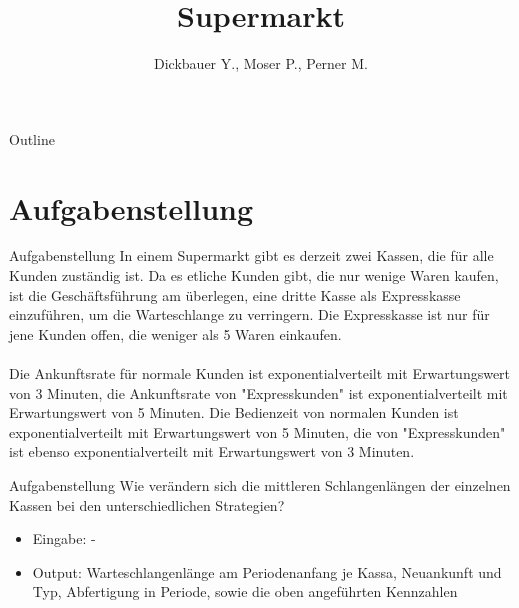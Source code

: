 

\title[BSP30 - Supermarkt]{Supermarkt}
\author{Dickbauer Y., Moser P., Perner M.}



\begin{frame}
  \titlepage
\end{frame}

\begin{frame}{Outline}
  \tableofcontents
\end{frame}

\section{Aufgabenstellung}
\begin{frame}{Aufgabenstellung}
In einem Supermarkt gibt es derzeit zwei Kassen, die für alle Kunden zuständig ist. Da es etliche Kunden gibt, die nur wenige Waren kaufen, ist die Geschäftsführung am überlegen, eine dritte Kasse als Expresskasse einzuführen, um die Warteschlange zu verringern. Die Expresskasse ist nur für jene Kunden offen, die weniger als 5 Waren einkaufen.
\\~\\
Die Ankunftsrate für normale Kunden ist exponentialverteilt mit Erwartungswert von 3 Minuten, die Ankunftsrate von "Expresskunden" ist exponentialverteilt mit Erwartungswert von 5 Minuten. Die Bedienzeit von normalen Kunden ist exponentialverteilt mit Erwartungswert von 5 Minuten, die von "Expresskunden" ist ebenso exponentialverteilt mit Erwartungswert von 3 Minuten.
\end{frame}

\begin{frame}{Aufgabenstellung}
Wie verändern sich die mittleren Schlangenlängen der einzelnen Kassen bei den unterschiedlichen Strategien?
\vspace{1cm}
\begin{itemize}
  \item Eingabe: -
  \item Output: Warteschlangenlänge am Periodenanfang je Kassa, Neuankunft und Typ, Abfertigung in Periode, sowie die oben angeführten Kennzahlen
\end{itemize}
\end{frame}

